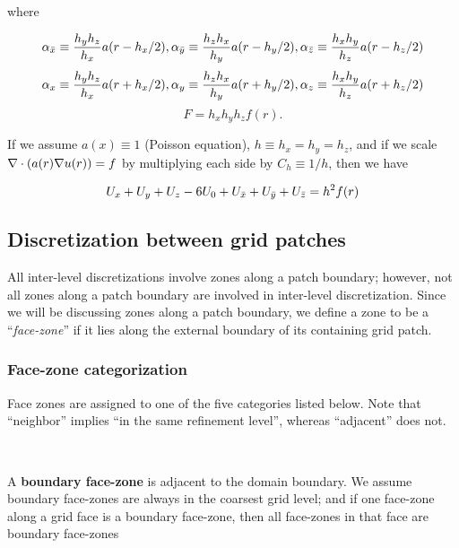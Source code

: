 \documentclass[10pt]{article}
\begin{document}
where

\[\alpha_{\bar{x}}  \equiv  \frac{h_yh_z}{h_x} a(r-h_x/2),
 \alpha_{\bar{y}}  \equiv  \frac{h_zh_x}{h_y} a(r-h_y/2), 
 \alpha_{\bar{z}}  \equiv  \frac{h_xh_y}{h_z} a(r-h_z/2) \]
 \[\alpha_{x}  \equiv  \frac{h_yh_z}{h_x} a(r+h_x/2), 
 \alpha_{y}  \equiv  \frac{h_zh_x}{h_y} a(r+h_y/2),
 \alpha_{z}  \equiv  \frac{h_xh_y}{h_z} a(r+h_z/2) \]
 \[F = h_xh_yh_z f(r). \]

If we assume $a(x)\equiv 1$ (Poisson equation), $h\equiv h_x = h_y =
h_z$, and if we scale $\nabla\cdot(a(r) \nabla u(r)) = f$ by multiplying
each side by $C_h \equiv 1/h$, then we have

\[ U_{x} + U_{y} + U_{z} - 6U_{0} + U_{\bar{x}} + U_{\bar{y}} + U_{\bar{z}} = h^2 f(r) \]

\subsection{Discretization between grid patches} \label{ss:discret-amr}

All inter-level discretizations involve zones along a patch boundary;
however, not all zones along a patch boundary are involved in
inter-level discretization.  Since we will be discussing zones along a
patch boundary, we define a zone to be a ``\textit{face-zone}'' if it
lies along the external boundary of its containing grid patch.


\subsubsection{Face-zone categorization}

Face zones are assigned to one of the five categories listed below.
Note that ``neighbor'' implies ``in the same refinement level'',
whereas ``adjacent'' does not.


\begin{minipage}{1in}
\end{minipage} \
\begin{minipage}{5.8in}
 A \textbf{boundary face-zone} is adjacent to the domain boundary.  We
assume boundary face-zones are always in the coarsest grid level; and
if one face-zone along a grid face is a boundary face-zone, then all
face-zones in that face are boundary face-zones
\end{minipage}
\end{document}
